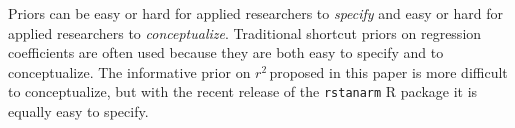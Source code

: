 \documentclass[11pt]{article}
\newcommand{\Rsq}{$r^2\,$}
\begin{document}
Priors can be easy or hard for applied researchers to \emph{specify} and easy or
hard for applied researchers to \emph{conceptualize}. Traditional shortcut
priors on regression coefficients are often used because they are both easy to
specify and to conceptualize. The informative prior on \Rsq proposed in this
paper is more difficult to conceptualize, but with the recent release of the
{\tt rstanarm} R package it is equally easy to specify.


\nocite{guan}
\nocite{Rcore}
\nocite{HSAUR3-package}



\end{document}

